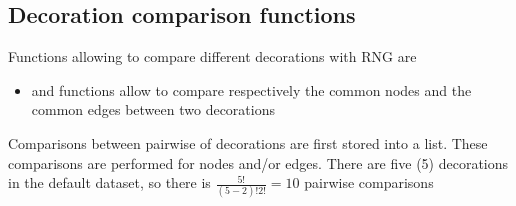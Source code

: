 \documentclass[article]{jss}\usepackage{knitr}
\begin{document}
\subsection{Decoration comparison functions} \label{sec:functions_one}

Functions allowing to compare different decorations with RNG are

\begin{itemize}
\setlength\itemsep{.1em}
\item {} and  functions allow to compare respectively the common nodes and the common edges between two decorations
\end{itemize}

Comparisons between pairwise of decorations are first stored into a list. These comparisons are performed for nodes and/or edges. There are five (5) decorations in the default dataset, so there is $\frac{5!}{(5-2)!2!}={10}$ pairwise comparisons

\end{document}

